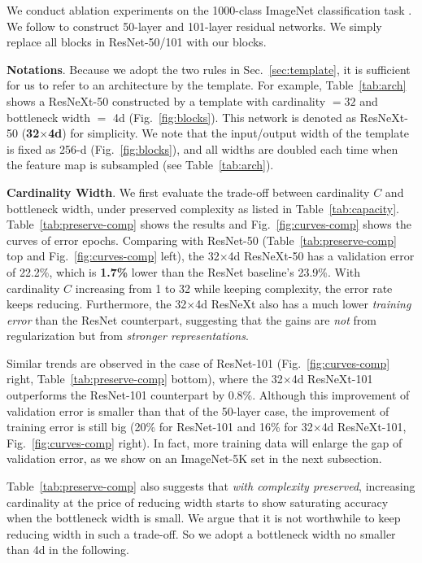 \documentclass[10pt,twocolumn,letterpaper]{article}
\newcommand{\m}{$\times$}
\begin{document}
We conduct ablation experiments on the 1000-class ImageNet classification task \cite{Russakovsky2015}. We follow \cite{He2016} to construct 50-layer and 101-layer residual networks. We simply replace all blocks in ResNet-50/101 with our blocks.

\vspace{.5em}
\noindent\textbf{Notations}.
Because we adopt the two rules in Sec.~\ref{sec:template}, it is sufficient for us to refer to an architecture by the template.
For example, Table~\ref{tab:arch} shows a ResNeXt-50 constructed by a template with cardinality $= 32$ and bottleneck width $=$ 4d (Fig.~\ref{fig:blocks}). This network is denoted as ResNeXt-50 (\textbf{32\m4d}) for simplicity. We note that the input/output width of the template is fixed as 256-d (Fig.~\ref{fig:blocks}), and all widths are doubled each time when the feature map is subsampled (see Table~\ref{tab:arch}).

\vspace{.5em}
\noindent\textbf{Cardinality \vs Width}.
We first evaluate the trade-off between cardinality $C$ and bottleneck width, under preserved complexity as listed in Table~\ref{tab:capacity}.
Table~\ref{tab:preserve-comp} shows the results and Fig.~\ref{fig:curves-comp} shows the curves of error \vs epochs.
Comparing with ResNet-50 (Table~\ref{tab:preserve-comp} top and Fig.~\ref{fig:curves-comp} left), the 32\m4d ResNeXt-50 has a validation error of 22.2\%, which is \textbf{1.7\%} lower than the ResNet baseline's 23.9\%. With cardinality $C$ increasing from 1 to 32 while keeping complexity, the error rate keeps reducing.
Furthermore, the 32\m4d ResNeXt also has a much lower \emph{training error} than the ResNet counterpart, suggesting that the gains are \emph{not} from regularization but from \emph{stronger representations}.

Similar trends are observed in the case of ResNet-101 (Fig.~\ref{fig:curves-comp} right, Table~\ref{tab:preserve-comp} bottom), where the 32\m4d ResNeXt-101 outperforms the ResNet-101 counterpart by 0.8\%. Although this improvement of validation error is smaller than that of the 50-layer case, the improvement of training error is still big (20\% for ResNet-101 and 16\% for 32\m4d ResNeXt-101, Fig.~\ref{fig:curves-comp} right). 
In fact, more training data will enlarge the gap of validation error, as we show on an ImageNet-5K set in the next subsection.

Table~\ref{tab:preserve-comp} also suggests that \emph{with complexity preserved}, increasing cardinality at the price of reducing width starts to show saturating accuracy when the bottleneck width is small. We argue that it is not worthwhile to keep reducing width in such a trade-off. So we adopt a bottleneck width no smaller than 4d in the following.
\end{document}
